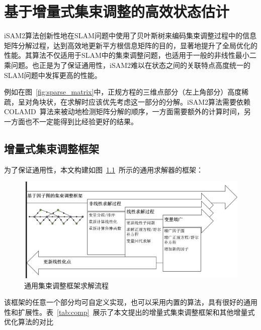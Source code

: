 \chapter{基于增量式集束调整的高效状态估计}\label{ch:ba}

iSAM2算法\citep{kaess2008isam,kaess2012isam2}创新性地在SLAM问题中使用了贝叶斯树来编码集束调整过程中的信息矩阵分解过程，达到高效地更新平方根信息矩阵的目的，显著地提升了全局优化的性能。其算法不仅适用于SLAM中的集束调整问题，也适用于一般的非线性最小二乘问题。也正是为了保证通用性，iSAM2难以在状态之间的关联特点高度统一的SLAM问题中发挥更高的性能。

例如在图~\ref{fig:sparse_matrix}中，正规方程的三维点部分（左上角部分）高度稀疏，呈对角块状，在求解时应该优先考虑这一部分的分解。iSAM2算法需要依赖COLAMD\citep{davis2004algorithm}~算法来被动地检测矩阵分解的顺序，一方面需要额外的计算时间，另一方面也不一定能得到比经验更好的结果。





\section{增量式集束调整框架}

为了保证通用性，本文构建如图~\ref{fig:framework}~所示的通用求解器的框架：

\begin{figure}[htb!]
    \centering
    \includegraphics[scale=.5]{Pictures/framework.png}
    \caption{通用集束调整框架求解流程}
    \label{fig:framework}
\end{figure}

该框架的任意一个部分均可自定义实现，也可以采用内置的算法，具有很好的通用性和扩展性。表~\ref{tab:comp}~展示了本文提出的增量式集束调整框架和其他增量式优化算法的对比

